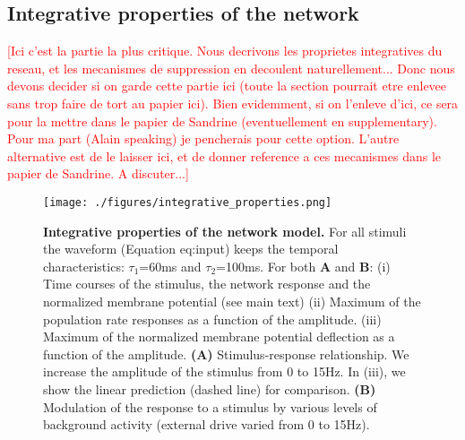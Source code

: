 \documentclass[8pt, colorlinks, a4paper]{article}
\renewcommand\ref{}
\newcommand{\remark}[1]{{\textcolor{red}{#1}}}
\newcommand{\corr}[1]{{#1}}
\begin{document}
\subsection{\corr{Integrative properties of the network}}
\label{sec-4-7}

\remark{[Ici c'est la partie la plus critique.  Nous decrivons les
  proprietes integratives du reseau, et les mecanismes de suppression
  en decoulent naturellement...  Donc nous devons decider si on garde
  cette partie ici (toute la section pourrait etre enlevee sans trop
  faire de tort au papier ici).  Bien evidemment, si on l'enleve
  d'ici, ce sera pour la mettre dans le papier de Sandrine
  (eventuellement en supplementary).  Pour ma part (Alain speaking) je
  pencherais pour cette option.  L'autre alternative est de le laisser
  ici, et de donner reference a ces mecanismes dans le papier de
  Sandrine.  A discuter...]}

\begin{figure}[tb!]
\centering
\texttt{[image: ./figures/integrative\_properties.png]}

\caption{\label{fig:integrative-prop}\corr{\textbf{Integrative
      properties of the network model.} For all stimuli the waveform
    (Equation \ref{eq:input}) keeps the temporal characteristics: \(
    \tau_1 \)=60ms and \( \tau_2 \)=100ms. For both \textbf{A} and
    \textbf{B}: (i) Time courses of the stimulus, the network response
    and the normalized membrane potential (see main text) (ii) Maximum
    of the population rate responses as a function of the amplitude.
    (iii) Maximum of the normalized membrane potential deflection as a
    function of the amplitude. \textbf{(A)} Stimulus-response
    relationship. We increase the amplitude of the stimulus from 0 to
    15Hz. In (iii), we show the linear prediction (dashed line) for
    comparison. \textbf{(B)} Modulation of the response to a stimulus
    by various levels of background activity (external drive varied
    from 0 to 15Hz).}}

\end{figure}
\end{document}
